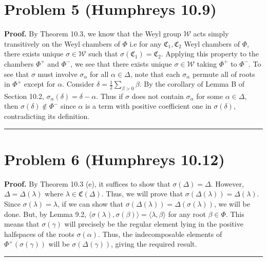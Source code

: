 \documentclass[12pt]{article}%
\newenvironment{proof}[1][Proof]{\textbf{#1.} }{\ \rule{0.5em}{0.5em}}
\begin{document}
\section*{Problem 5 (Humphreys 10.9)}
\begin{proof}
  By Theorem 10.3, we know that the Weyl group $\mathcal{W}$ acts simply transitively on the Weyl chambers of $\Phi$ i.e for any $\mathfrak{C}_1,\mathfrak{C}_2$ Weyl chambers of $\Phi$, there exists unique $\sigma \in \mathcal{W}$ such that $\sigma(\mathfrak{C}_1) = \mathfrak{C}_2$. Applying this property to the chambers $\Phi^{+}$ and $\Phi^{-}$, we see that there exists unique $\sigma \in \mathcal{W}$ taking $\Phi^{+}$ to $\Phi^{-}$. To see that $\sigma$ must involve $\sigma_{\alpha}$ for all $\alpha \in \Delta$, note that each $\sigma_{\alpha}$ permute all of roots in $\Phi^+$ except for $\alpha$. Consider $\delta = \frac{1}{2} \sum_{\beta > 0} \beta$. By the corollary of Lemma B of Section 10.2, $\sigma_{\alpha}(\delta) = \delta - \alpha$. Thus if $\sigma$ does not contain $\sigma_{\alpha}$ for some $\alpha \in \Delta$, then $\sigma(\delta) \not\in \Phi^-$ since $\alpha$ is a term with positive coefficient one in $\sigma(\delta)$, contradicting its definition.
\end{proof}

\section*{Problem 6 (Humphreys 10.12)}
\begin{proof}
  By Theorem 10.3 (e), it suffices to show that $\sigma(\Delta) = \Delta$. However, $\Delta = \Delta(\lambda)$ where $\lambda \in \mathfrak{C}(\Delta)$. Thus, we will prove that $\sigma(\Delta(\lambda)) = \Delta(\lambda)$.
  Since $\sigma(\lambda) = \lambda$, if we can show that $\sigma(\Delta(\lambda)) = \Delta(\sigma(\lambda))$, we will be done. But, by Lemma 9.2, $\langle \sigma(\lambda),\sigma(\beta) \rangle = \langle \lambda, \beta \rangle$ for any root $\beta \in \Phi$. This means that $\sigma(\gamma)$ will precisely be the regular element lying in the positive halfspaces of the roots $\sigma(\alpha)$. Thus, the indecomposable elements of $\Phi^+({\sigma(\gamma)})$ will be $\sigma(\Delta(\gamma))$, giving the required result.
\end{proof}
\end{document}
